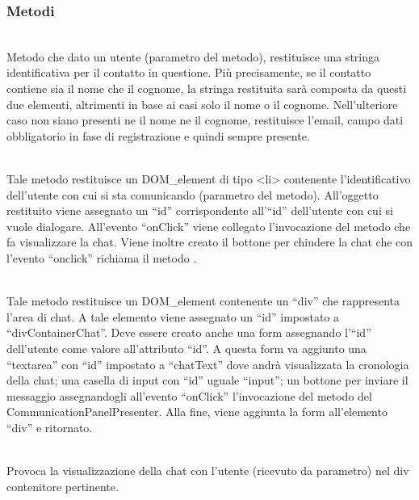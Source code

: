 \subsubsection*{Metodi}
\begin{description}
\item{}\\
	Metodo che dato un utente (parametro del metodo), restituisce una stringa identificativa per il contatto in questione. Più precisamente, se il contatto contiene sia il nome che il cognome, la stringa restituita sarà composta da questi due elementi, altrimenti in base ai casi solo il nome o il cognome. Nell'ulteriore caso non siano presenti ne il nome ne il cognome, restituisce l'email, campo dati obbligatorio in fase di registrazione e quindi sempre presente.

\item{}\\
	Tale metodo restituisce un DOM\_element di tipo <li> contenente l'identificativo dell'utente con cui si sta comunicando (parametro del metodo). All'oggetto restituito viene assegnato un ``id'' corrispondente all'``id'' dell'utente con cui si vuole dialogare. All'evento ``onClick'' viene collegato l'invocazione del metodo  che fa visualizzare la chat. Viene inoltre creato il bottone per chiudere la chat che con l'evento ``onclick'' richiama il metodo .

\item{}\\
	Tale metodo restituisce un DOM\_element contenente un ``div'' che rappresenta l'area di chat. A tale elemento viene assegnato un ``id'' impostato a ``divContainerChat''. Deve essere creato anche una form assegnando l'``id'' dell'utente come valore all'attributo ``id''. A questa form va aggiunto una ``textarea'' con ``id'' impostato a ``chatText'' dove andrà visualizzata la cronologia della chat; una casella di input con ``id'' uguale ``input''; un bottone per inviare il messaggio assegnandogli all'evento ``onClick'' l'invocazione del metodo  del CommunicationPanelPresenter. Alla fine, viene aggiunta la form all'elemento ``div'' e ritornato.
	
\item{}\\
Provoca la visualizzazione della chat con l'utente (ricevuto da parametro) nel div contenitore pertinente.


\end{description}
